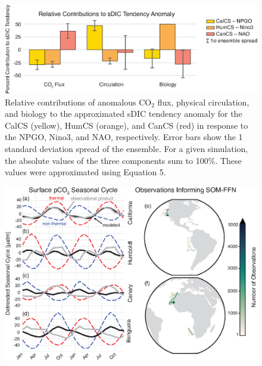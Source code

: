 \documentclass[hvmath, online,bgd]{copernicus_discussions}
\begin{document}
\clearpage
\begin{figure}[t]
	\includegraphics[width=12cm]{figures/figure9.eps}
	\caption{Relative contributions of anomalous CO$_{2}$ flux, physical circulation, and biology to the approximated sDIC tendency anomaly for the CalCS (yellow), HumCS (orange), and CanCS (red) in response to the NPGO, Nino3, and NAO, respectively. Error bars show the 1 standard deviation spread of the ensemble. For a given simulation, the absolute values of the three components sum to 100\%. These values were approximated using Equation 5.}
	\label{Fig:sDICDecomp}
\end{figure}

\clearpage
\begin{figure}[t]
	\includegraphics[width=12cm]{figures/seasonal_plot.eps}
	\caption{}
	\label{Fig:seasonal}
\end{figure}
\end{document}
